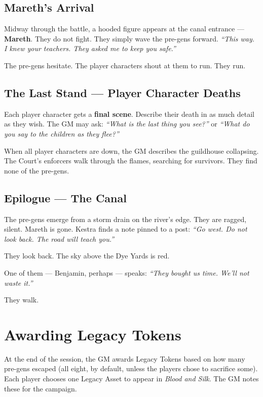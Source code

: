\documentclass[10pt,twoside]{book}
\begin{document}
\subsection{Mareth's Arrival}

Midway through the battle, a hooded figure appears at the canal entrance --- \textbf{Mareth}. They do not fight. They simply wave the pre-gens forward. \textit{``This way. I knew your teachers. They asked me to keep you safe.''}

The pre-gens hesitate. The player characters shout at them to run. They run.

\subsection{The Last Stand --- Player Character Deaths}

Each player character gets a \textbf{final scene}. Describe their death in as much detail as they wish. The GM may ask: \textit{``What is the last thing you see?''} or \textit{``What do you say to the children as they flee?''}

When all player characters are down, the GM describes the guildhouse collapsing. The Court's enforcers walk through the flames, searching for survivors. They find none of the pre-gens.

\subsection{Epilogue --- The Canal}

The pre-gens emerge from a storm drain on the river's edge. They are ragged, silent. Mareth is gone. Kestra finds a note pinned to a post: \textit{``Go west. Do not look back. The road will teach you.''}

They look back. The sky above the Dye Yards is red.

One of them --- Benjamin, perhaps --- speaks: \textit{``They bought us time. We'll not waste it.''}

They walk.

\section*{Awarding Legacy Tokens}

At the end of the session, the GM awards Legacy Tokens based on how many pre-gens escaped (all eight, by default, unless the players chose to sacrifice some). Each player chooses one Legacy Asset to appear in \textit{Blood and Silk}. The GM notes these for the campaign.
\end{document}
